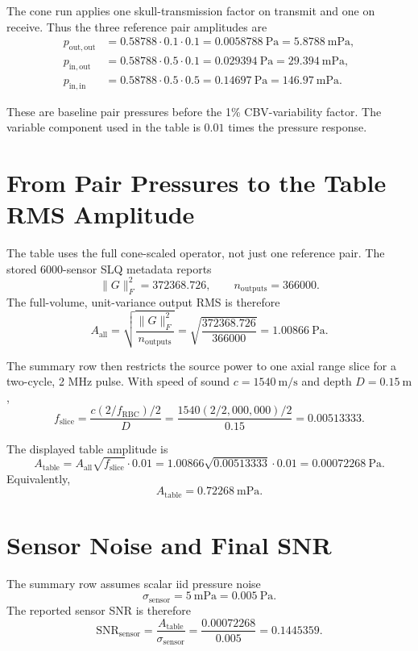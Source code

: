 \documentclass[11pt]{article}
\begin{document}
The cone run applies one skull-transmission factor on transmit and one on
receive.  Thus the three reference pair amplitudes are
\[
\begin{aligned}
  p_{\mathrm{out,out}}
    &= 0.58788 \cdot 0.1 \cdot 0.1
     = 0.0058788~\mathrm{Pa}
     = 5.8788~\mathrm{mPa},\\
  p_{\mathrm{in,out}}
    &= 0.58788 \cdot 0.5 \cdot 0.1
     = 0.029394~\mathrm{Pa}
     = 29.394~\mathrm{mPa},\\
  p_{\mathrm{in,in}}
    &= 0.58788 \cdot 0.5 \cdot 0.5
     = 0.14697~\mathrm{Pa}
     = 146.97~\mathrm{mPa}.
\end{aligned}
\]

These are baseline pair pressures before the 1\% CBV-variability factor.  The
variable component used in the table is \(0.01\) times the pressure response.

\section*{From Pair Pressures to the Table RMS Amplitude}

The table uses the full cone-scaled operator, not just one reference pair.  The
stored 6000-sensor SLQ metadata reports
\[
  \|G\|_F^2 = 372368.726,\qquad n_{\mathrm{outputs}}=366000.
\]
The full-volume, unit-variance output RMS is therefore
\[
  A_{\mathrm{all}}
  =
  \sqrt{\frac{\|G\|_F^2}{n_{\mathrm{outputs}}}}
  =
  \sqrt{\frac{372368.726}{366000}}
  =
  1.00866~\mathrm{Pa}.
\]

The summary row then restricts the source power to one axial range slice for a
two-cycle, 2 MHz pulse.  With speed of sound \(c=1540~\mathrm{m/s}\) and depth
\(D=0.15~\mathrm{m}\),
\[
  f_{\mathrm{slice}}
  =
  \frac{c(2/f_{\mathrm{RBC}})/2}{D}
  =
  \frac{1540(2/2{,}000{,}000)/2}{0.15}
  =
  0.00513333.
\]

The displayed table amplitude is
\[
  A_{\mathrm{table}}
  =
  A_{\mathrm{all}}\sqrt{f_{\mathrm{slice}}}\cdot 0.01
  =
  1.00866\sqrt{0.00513333}\cdot 0.01
  =
  0.00072268~\mathrm{Pa}.
\]
Equivalently,
\[
  A_{\mathrm{table}} = 0.72268~\mathrm{mPa}.
\]

\section*{Sensor Noise and Final SNR}

The summary row assumes scalar iid pressure noise
\[
  \sigma_{\mathrm{sensor}}=5~\mathrm{mPa}=0.005~\mathrm{Pa}.
\]
The reported sensor SNR is therefore
\[
  \mathrm{SNR}_{\mathrm{sensor}}
  =
  \frac{A_{\mathrm{table}}}{\sigma_{\mathrm{sensor}}}
  =
  \frac{0.00072268}{0.005}
  =
  0.1445359.
\]
\end{document}

